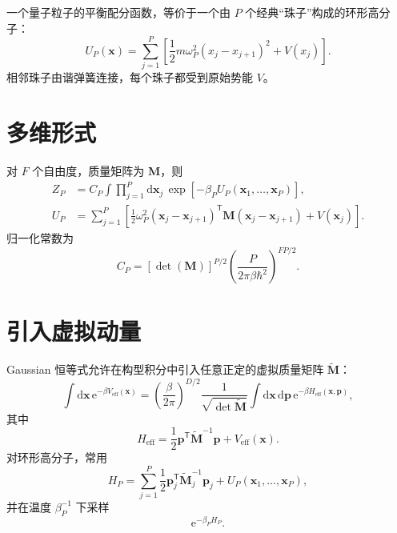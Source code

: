 \documentclass[11pt,a4paper,oneside,openany,fontset=fandol]{ctexbook}
\newcommand{\dd}{\mathrm{d}}
\newcommand{\ee}{\mathrm{e}}
\newcommand{\vct}[1]{\bm{#1}}
\newcommand{\mat}[1]{\mathbf{#1}}
\begin{document}
\begin{keybox}[环形高分子同构]
一个量子粒子的平衡配分函数，等价于一个由 $P$ 个经典“珠子”构成的环形高分子：
\[
\boxed{
U_P(\vct x)
=
\sum_{j=1}^{P}
\left[
\frac12m\omega_P^2(x_j-x_{j+1})^2+V(x_j)
\right]
}.
\]
相邻珠子由谐弹簧连接，每个珠子都受到原始势能 $V$。
\end{keybox}

\begin{center}
\end{center}

\section{多维形式}

对 $F$ 个自由度，质量矩阵为 $\mat M$，则
\begin{align}
Z_P
&=
C_P
\int\prod_{j=1}^{P}\dd\vct x_j\,
\exp\left[-\beta_P U_P(\vct x_1,\ldots,\vct x_P)\right],\\
U_P
&=
\sum_{j=1}^{P}
\left[
\frac12\omega_P^2
(\vct x_j-\vct x_{j+1})^{\mathsf T}
\mat M
(\vct x_j-\vct x_{j+1})
+
V(\vct x_j)
\right].
\end{align}
归一化常数为
\[
C_P=
\left[
\det(\mat M)
\right]^{P/2}
\left(
\frac{P}{2\pi\beta\hbar^2}
\right)^{FP/2}.
\]

\section{引入虚拟动量}

Gaussian 恒等式允许在构型积分中引入任意正定的虚拟质量矩阵 $\widetilde{\mat M}$：
\[
\int\dd\vct x\,\ee^{-\beta V_{\mathrm{eff}}(\vct x)}
=
\left(\frac{\beta}{2\pi}\right)^{D/2}
\frac{1}{\sqrt{\det\widetilde{\mat M}}}
\int\dd\vct x\,\dd\vct p\,
\ee^{-\beta H_{\mathrm{eff}}(\vct x,\vct p)},
\]
其中
\[
H_{\mathrm{eff}}
=
\frac12\vct p^{\mathsf T}
\widetilde{\mat M}^{-1}\vct p
+
V_{\mathrm{eff}}(\vct x).
\]
对环形高分子，常用
\[
H_P
=
\sum_{j=1}^{P}
\frac12\vct p_j^{\mathsf T}
\widetilde{\mat M}_j^{-1}\vct p_j
+
U_P(\vct x_1,\ldots,\vct x_P),
\]
并在温度 $\beta_P^{-1}$ 下采样
\[
\ee^{-\beta_P H_P}.
\]
\end{document}
